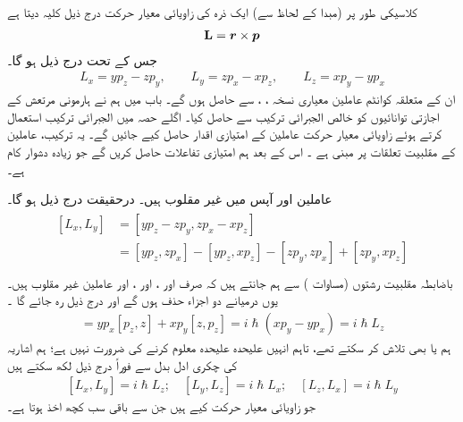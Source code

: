  کلاسیکی طور پر  (مبدا کے لحاظ سے)  ایک ذرہ کی زاویائی معیار حرکت درج ذیل کلیہ دیتا ہے 
\begin{align}
\operatorname{\mathbf{L}}={{\boldsymbol{r}}}\times{\ensuremath{{\boldsymbol{p}}}}
\end{align}
جس کے تحت درج ذیل ہو گا۔
\begin{align}\label{مساوات_تین_ابعادی_متعدد_رشتے}
L_{x}=yp_{z}-zp_{y}, \quad\quad L_{y}=zp_{x}-xp_{z}, \quad \quad L_{z}=xp_{y}-yp_{x}
\end{align}
ان کے متعلقہ کوانٹم عاملین معیاری نسخہ ، ،    سے حاصل ہوں گے۔ باب    میں ہم نے ہارمونی مرتعش کے اجازتی  توانائیوں کو خالص الجبرائی ترکیب سے حاصل کیا۔  اگلے  حصہ میں  الجبرائی ترکیب  استعمال کرتے ہوئے زاویائی معیار حرکت  عاملین کے امتیازی اقدار حاصل کیے جائیں گے۔ یہ ترکیب،  عاملین کے  مقلبیت  تعلقات پر مبنی ہے ۔ اس کے بعد ہم امتیازی تفاعلات حاصل کریں گے جو  زیادہ دشوار کام ہے۔

عاملین  اور  آپس میں غیر مقلوب  ہیں۔ درحقیقت درج ذیل ہو گا۔
\begin{gather}
\begin{aligned}
[L_{x},L_{y}]&=[yp_{z}-zp_{y},zp_{x}-xp_{z}]\\
&=[yp_{z},zp_{x}]-[yp_{z},xp_{z}]-[zp_{y},zp_{x}]+[zp_{y},xp_{z}]\\
\end{aligned}
\end{gather}
باضابطہ مقلبیت رشتوں  (مساوات )  سے ہم جانتے ہیں کہ صرف  اور ،   اور ،   اور  عاملین   غیر مقلوب ہیں۔  یوں درمیانے  دو اجزاء  حذف ہوں گے اور  درج ذیل  رہ جائے گا ۔
\begin{align}
[L_x, L_y] = y p_x [p_z, z] + x p_y [z, p_z] = i \hslash (x p_y - y p_x) = i \hslash L_z
\end{align}
ہم  یا  بھی تلاش کر سکتے تھے،  تاہم انہیں علیحدہ علیحدہ معلوم کرنے کی ضرورت نہیں ہے؛  ہم اشاریہ کی
 چکری   ادل بدل  سے فوراً درج ذیل لکھ سکتے ہیں 
\begin{align}\label{مساوات_تین_ابعادی_بنیادی_مقلبیت_رشتہ}
[L_x, L_y] = i \hslash L_z ; \quad [L_y, L_z] = i \hslash L_x ; \quad [L_z, L_x] = i \hslash L_y
\end{align}
جو زاویائی معیار حرکت کیے   ہیں جن سے باقی سب کچھ اخذ ہوتا ہے۔

